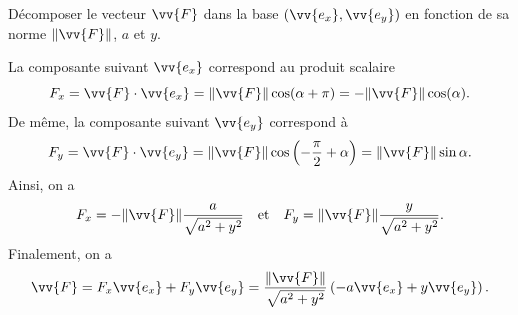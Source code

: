
\begin{enonce}
Décomposer le vecteur $\vv{F}$ dans la base $(\vv{e_x}, \vv{e_y})$ %
en fonction de sa norme $\lVert \vv{F} \rVert$, $a$ et $y$.

\end{enonce}


\begin{corrige}
La composante suivant $\vv{e_x}$ correspond au produit scalaire
\[
	{F}_x=\vv{F}\cdot \vv{e_x}=\lVert \vv{F}\rVert\cos(\alpha+\pi)=-\lVert \vv{F} \rVert\cos (\alpha).
\]
De même, la composante suivant $\vv{e_y}$ correspond à
\[
	{F}_y=\vv{F}\cdot \vv{e_y}=\lVert \vv{F} \rVert\cos\left(-\frac{\pi}{2}+\alpha\right)=\lVert \vv{F} \rVert\sin\alpha.
	\]
Ainsi, on a
\[
{F}_x=-\lVert \vv{F}\rVert\frac{a}{\sqrt{a^2 + y^2}} \quad \text{et} \quad {F}_y=\lVert \vv{F} \rVert\frac{y}{\sqrt{a^2 + y^2}}.
\]
Finalement, on a 
\[
\vv{F}= {F}_x \vv{e_x} + {F}_y \vv{e_y} = \frac{\lVert \vv{F} \rVert}{\sqrt{a^2 + y^2}}\left( -a \vv{e_x} + y \vv{e_y} \right).
\]
\end{corrige}


\finEntrainement









\hauteurLargeurCadreReponse		{6mm}{6cm}
\initialisationEntrainement

